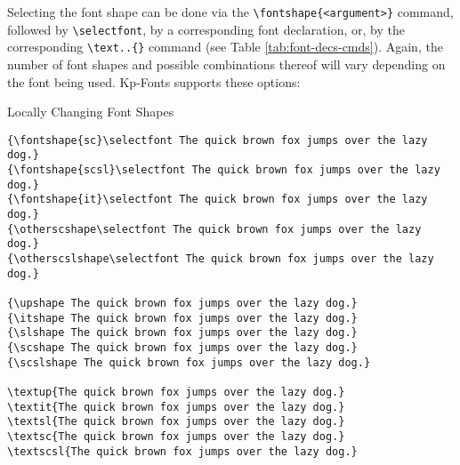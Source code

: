 \documentclass[a4paper,oneside,11pt]{article}
\newcommand\comm[1]{\texttt{\textbackslash#1}}
\begin{document}
Selecting the  font shape can  be done via  the \comm{fontshape\{<argument>\}}
command,   followed   by   \comm{selectfont},    by   a   corresponding   font
declaration,  or, by  the  corresponding \verb|\text..{}|  command (see  Table
\ref{tab:font-decs-cmds}).   Again, the  number of  font shapes   and possible
combinations  thereof will  vary depending  on the  font being  used. Kp-Fonts
supports these options:

\begin{titled-frame}
{\textsf{Locally Changing Font Shapes}}
\vspace{-1em}
\small
\begin{verbatim}
{\fontshape{sc}\selectfont The quick brown fox jumps over the lazy dog.}
{\fontshape{scsl}\selectfont The quick brown fox jumps over the lazy dog.}
{\fontshape{it}\selectfont The quick brown fox jumps over the lazy dog.}
{\otherscshape\selectfont The quick brown fox jumps over the lazy dog.}
{\otherscslshape\selectfont The quick brown fox jumps over the lazy dog.}

{\upshape The quick brown fox jumps over the lazy dog.}
{\itshape The quick brown fox jumps over the lazy dog.}
{\slshape The quick brown fox jumps over the lazy dog.}
{\scshape The quick brown fox jumps over the lazy dog.}
{\scslshape The quick brown fox jumps over the lazy dog.}

\textup{The quick brown fox jumps over the lazy dog.}
\textit{The quick brown fox jumps over the lazy dog.}
\textsl{The quick brown fox jumps over the lazy dog.}
\textsc{The quick brown fox jumps over the lazy dog.}
\textscsl{The quick brown fox jumps over the lazy dog.}


\end{verbatim}
\end{titled-frame}
\end{document}
